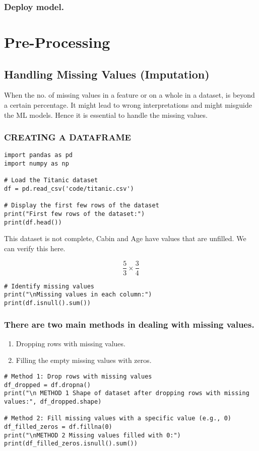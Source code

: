 \documentclass[11pt]{article}
\begin{document}
\subsubsection{Deploy model.}
\label{sec:org8908f2e}
\section{Pre-Processing}
\label{sec:org89451e9}
\subsection{Handling Missing Values (Imputation)}
\label{sec:org76b79cd}
When the no. of missing values in a feature or on a whole in a dataset, is beyond a certain percentage. It might lead to wrong interpretations and might misguide the ML models.
Hence it is essential to handle the missing values.
\subsubsection{CREATING A DATAFRAME}
\label{sec:orgaa6727d}
\begin{verbatim}
import pandas as pd
import numpy as np

# Load the Titanic dataset
df = pd.read_csv('code/titanic.csv')

# Display the first few rows of the dataset
print("First few rows of the dataset:")
print(df.head())
\end{verbatim}

This dataset is not complete, Cabin and Age have values that are unfilled. We can verify this here.

$$\frac{5}{3} \times \frac{3}{4}$$

\begin{verbatim}
# Identify missing values
print("\nMissing values in each column:")
print(df.isnull().sum())

\end{verbatim}
\subsubsection{There are two main methods in dealing with missing values.}
\label{sec:orgb3edb13}
\begin{enumerate}
\item Dropping rows with missing values.
\item Filling the empty missing values with zeros.
\end{enumerate}
\begin{verbatim}
# Method 1: Drop rows with missing values
df_dropped = df.dropna()
print("\n METHOD 1 Shape of dataset after dropping rows with missing values:", df_dropped.shape)

# Method 2: Fill missing values with a specific value (e.g., 0)
df_filled_zeros = df.fillna(0)
print("\nMETHOD 2 Missing values filled with 0:")
print(df_filled_zeros.isnull().sum())

\end{verbatim}
\end{document}
